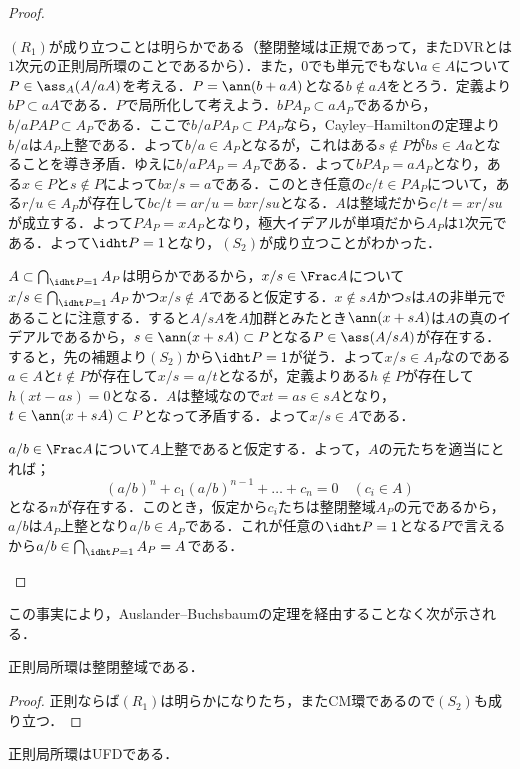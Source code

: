 \begin{proof}
	\begin{eqv}[3]
		\item $(R_1)$が成り立つことは明らかである（整閉整域は正規であって，またDVRとは$1$次元の正則局所環のことであるから）．また，$0$でも単元でもない$a\in A$について$P\in\ass_A (A/aA)$を考える．$P=\ann (b+aA)$となる$b\not\in aA$をとろう．定義より$bP\subset aA$である．$P$で局所化して考えよう．$bPA_P\subset aA_P$であるから，$b/aPAP\subset A_P$である．ここで$b/aPA_P\subset PA_P$なら，Cayley--Hamiltonの定理より$b/a$は$A_P$上整である．よって$b/a\in A_P$となるが，これはある$s\not\in P$が$bs\in Aa$となることを導き矛盾．ゆえに$b/aPA_P=A_P$である．よって$bPA_P=aA_P$となり，ある$x\in P$と$s\not\in P$によって$bx/s=a$である．このとき任意の$c/t\in PA_P$について，ある$r/u\in A_P$が存在して$bc/t=ar/u=bxr/su$となる．$A$は整域だから$c/t=xr/su$が成立する．よって$PA_P=xA_P$となり，極大イデアルが単項だから$A_P$は$1$次元である．よって$\idht P=1$となり，$(S_2)$が成り立つことがわかった．
		\item $A\subset\bigcap_{\idht P=1}A_P$は明らかであるから，$x/s\in\Frac A$について$x/s\in\bigcap_{\idht P=1} A_P$かつ$x/s\not\in A$であると仮定する．$x\not\in sA$かつ$s$は$A$の非単元であることに注意する．すると$A/sA$を$A$加群とみたとき$\ann (x+sA)$は$A$の真のイデアルであるから，$s\in\ann(x+sA)\subset P$となる$P\in\ass (A/sA)$が存在する．すると，先の補題より$(S_2)$から$\idht P=1$が従う．よって$x/s\in A_P$なのである$a\in A$と$t\not\in P$が存在して$x/s=a/t$となるが，定義よりある$h\not\in P$が存在して$h(xt-as)=0$となる．$A$は整域なので$xt=as\in sA$となり，$t\in\ann(x+sA)\subset P$となって矛盾する．よって$x/s\in A$である．
		\item $a/b\in\Frac A$について$A$上整であると仮定する．よって，$A$の元たちを適当にとれば；
		\[(a/b)^n+c_1(a/b)^{n-1}+\dots+c_n=0\quad(c_i\in A)\]
		となる$n$が存在する．このとき，仮定から$c_i$たちは整閉整域$A_P$の元であるから，$a/b$は$A_P$上整となり$a/b\in A_P$である．これが任意の$\idht P=1$となる$P$で言えるから$a/b\in\bigcap_{\idht P=1}A_P=A$である．
	\end{eqv}
\end{proof}

この事実により，Auslander--Buchsbaumの定理を経由することなく次が示される．
\begin{cor}
	正則局所環は整閉整域である．
\end{cor}

\begin{proof}
	正則ならば$(R_1)$は明らかになりたち，またCM環であるので$(S_2)$も成り立つ．
\end{proof}

\begin{thm}
	正則局所環はUFDである．
\end{thm}